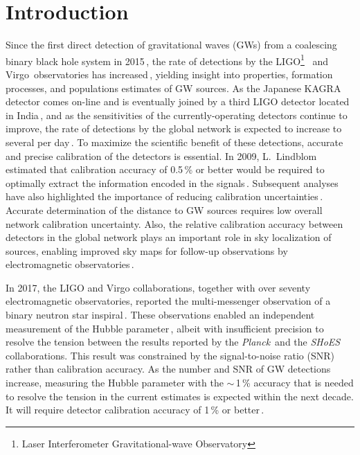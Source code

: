 \documentclass[12pt,a4paper,final]{iopart}
\begin{document}
\section{Introduction}
\label{sec:intro}
%
Since the first direct detection of gravitational waves (GWs) from a coalescing binary black hole system in 2015\,\cite{detection}, the rate of detections by the LIGO\footnote{Laser Interferometer Gravitational-wave Observatory}~\cite{detectorpaper} and Virgo\,\cite{VirgoPaper} observatories has increased\,\cite{O2Catalog}, yielding insight into properties, formation processes, and populations estimates of GW sources.
As the Japanese KAGRA\,\cite{kagradet} detector comes on-line and is eventually joined by a third LIGO detector located in India\,\cite{LIGOIndia}, and as the sensitivities of the currently-operating detectors continue to improve,  the rate of detections by the global network is expected to increase to  several per day\,\cite{detectionrate}.
%
To maximize the scientific benefit of these detections, accurate and precise calibration of the detectors is essential. In 2009, L.~Lindblom estimated that calibration accuracy of 0.5\,\% or better would be required to optimally extract the information encoded in the signals\,\cite{Lindblom}. Subsequent analyses have also highlighted the importance of reducing calibration uncertainties\,\cite{VitaleCal, GW150914Cal}.  Accurate determination of the distance to GW sources requires low overall network calibration uncertainty.  Also, the  relative calibration accuracy between detectors in the global network plays an important role in sky localization of sources, enabling improved sky maps for follow-up observations by electromagnetic observatories\,\cite{relcalibimp2}.

In 2017, the LIGO and Virgo collaborations, together with over seventy electromagnetic observatories, reported the multi-messenger observation of a binary neutron star inspiral\,\cite{GW170817}.  These observations enabled an independent measurement of the Hubble parameter\,\cite{hubble}, albeit with insufficient precision to resolve the tension between the results reported by the {\em{Planck}}\,\cite{planck} and the {\em {SHoES}}\,\cite{shoes} collaborations. This result was constrained by the signal-to-noise ratio (SNR) rather than calibration accuracy.   As the number and SNR of GW detections increase, measuring the Hubble parameter with the $\sim$\,1\,\% accuracy that is needed to resolve the tension in the current estimates is expected within the next decade.  It will require detector calibration accuracy of 1\,\% or better\,\cite{hubbleat1per}.    
\end{document}
